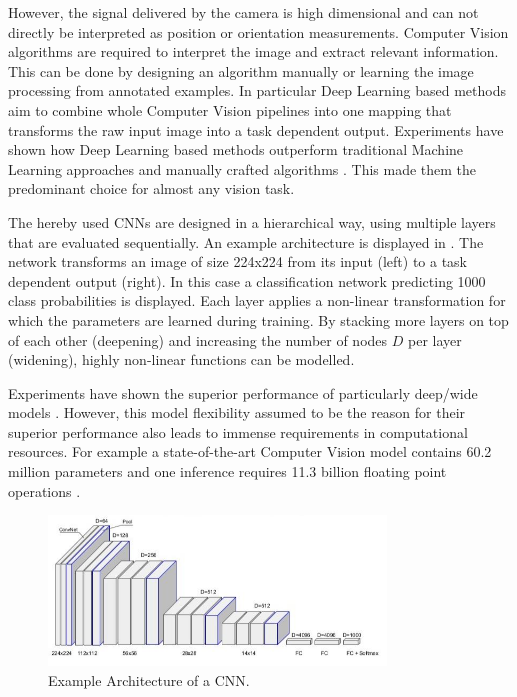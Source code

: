 However, the signal delivered by the camera is high dimensional and can not directly be interpreted as position or orientation measurements. Computer Vision algorithms are required to interpret the image and extract relevant information. This can be done by designing an algorithm manually or learning the image processing from annotated examples. In particular Deep Learning based methods aim to combine whole Computer Vision pipelines into one mapping that transforms the raw input image into a task dependent output. Experiments have shown how Deep Learning based methods outperform traditional Machine Learning approaches and manually crafted algorithms \cite{Razavian}. This made them the predominant choice for almost any vision task.

The hereby used \acp{CNN} are designed in a hierarchical way, using multiple layers that are evaluated sequentially. An example architecture is displayed in . The network transforms an image of size 224x224 from its input (left) to a task dependent output (right). In this case a classification network predicting 1000 class probabilities is displayed. Each layer applies a non-linear transformation for which the parameters are learned during training. By stacking more layers on top of each other (deepening) and increasing the number of nodes $D$ per layer (widening), highly non-linear functions can be modelled. 

Experiments have shown the superior performance of particularly deep/wide models \cite{He, He2015, Szegedy2014, Zagoruyko2016}. However, this model flexibility assumed to be the reason for their superior performance also leads to immense requirements in computational resources. For example a state-of-the-art Computer Vision model \cite{He2015} contains 60.2 million parameters and one inference requires 11.3 billion floating point operations \cite{Tschannen2017}. 

\begin{figure}[bhtp]
	\centering
	\includegraphics[width=0.8\textwidth]{fig/vgg_architecture}
	\caption{Example Architecture of a \ac{CNN}.}
	\label{fig:cnn_example}
\end{figure}

